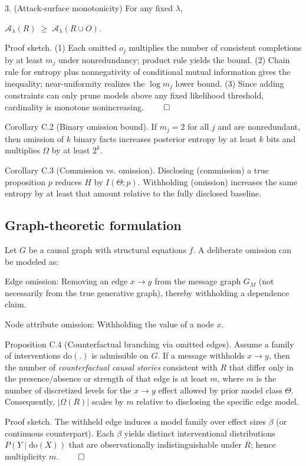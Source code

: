\documentclass{article}
\begin{document}
3. (Attack-surface monotonicity) For any fixed $\lambda$,

$\mathcal{A}_\lambda(R)\;\ge\;\mathcal{A}_\lambda(R\cup O)$.

Proof sketch. (1) Each omitted $o_j$ multiplies the number of consistent completions by at least $m_j$ under nonredundancy; product rule yields the bound. (2) Chain rule for entropy plus nonnegativity of conditional mutual information gives the inequality; near-uniformity realizes the $\log m_j$ lower bound. (3) Since adding constraints can only prune models above any fixed likelihood threshold, cardinality is monotone nonincreasing. $\qed$

Corollary C.2 (Binary omission bound).
If $m_j=2$ for all $j$ and are nonredundant, then omission of $k$ binary facts increases posterior entropy by at least $k$ bits and multiplies $\Omega$ by at least $2^k$.

Corollary C.3 (Commission vs. omission).
Disclosing (commission) a true proposition $p$ reduces $H$ by $I(\Theta;p)$. Withholding (omission) increases the same entropy by at least that amount relative to the fully disclosed baseline.

\subsection{Graph-theoretic formulation}

Let $G$ be a causal graph with structural equations $f$. A deliberate omission can be modeled as:

Edge omission: Removing an edge $x\to y$ from the message graph $G_M$ (not necessarily from the true generative graph), thereby withholding a dependence claim.

Node attribute omission: Withholding the value of a node $x$.

Proposition C.4 (Counterfactual branching via omitted edges).
Assume a family of interventions $\mathrm{do}(.)$ is admissible on $G$. If a message withholds $x\to y$, then the number of \emph{counterfactual causal stories} consistent with $R$ that differ only in the presence/absence or strength of that edge is at least $m$, where $m$ is the number of discretized levels for the $x\to y$ effect allowed by prior model class $\Theta$. Consequently, $|\Omega(R)|$ scales by $m$ relative to disclosing the specific edge model.

Proof sketch. The withheld edge induces a model family over effect sizes $\beta$ (or continuous counterpart). Each $\beta$ yields distinct interventional distributions $P(Y\mid \mathrm{do}(X))$ that are observationally indistinguishable under $R$; hence multiplicity $m$. $\qed$
\end{document}
